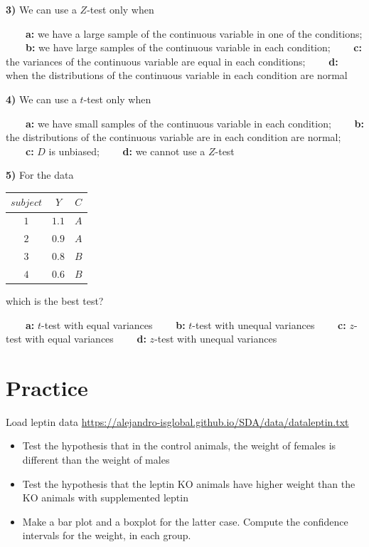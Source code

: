 \documentclass[
]{book}
\begin{document}
\textbf{3)} We can use a \(Z\)-test only when

\textbf{\(\qquad\)a:} we have a large sample of the continuous variable in one of the conditions;
\textbf{\(\qquad\)b:} we have large samples of the continuous variable in each condition;
\textbf{\(\qquad\)c:} the variances of the continuous variable are equal in each conditions;
\textbf{\(\qquad\)d:} when the distributions of the continuous variable in each condition are normal

\textbf{4)} We can use a \(t\)-test only when

\textbf{\(\qquad\)a:} we have small samples of the continuous variable in
each condition;
\textbf{\(\qquad\)b:} the distributions of the continuous variable are in each condition are normal;
\textbf{\(\qquad\)c:} \(D\) is unbiased;
\textbf{\(\qquad\)d:} we cannot use a \(Z\)-test

\textbf{5)} For the data

\begin{longtable}[]{@{}ccc@{}}
\toprule
\(subject\) & \(Y\) & \(C\) \\
\midrule
\endhead
\(1\) & \(1.1\) & \(A\) \\
\(2\) & \(0.9\) & \(A\) \\
\(3\) & \(0.8\) & \(B\) \\
\(4\) & \(0.6\) & \(B\) \\
\bottomrule
\end{longtable}

which is the best test?

\textbf{\(\qquad\)a:} \(t\)-test with equal variances
\textbf{\(\qquad\)b:} \(t\)-test with unequal variances
\textbf{\(\qquad\)c:} \(z\)-test with equal variances
\textbf{\(\qquad\)d:} \(z\)-test with unequal variances

\hypertarget{practice-6}{%
\section{Practice}\label{practice-6}}

Load leptin data \url{https://alejandro-isglobal.github.io/SDA/data/dataleptin.txt}

\begin{itemize}
\item
  Test the hypothesis that in the control animals, the weight of females is different than the weight of males
\item
  Test the hypothesis that the leptin KO animals have higher weight than the KO animals with supplemented leptin
\item
  Make a bar plot and a boxplot for the latter case. Compute the confidence intervals for the weight, in each group.
\end{itemize}
\end{document}
